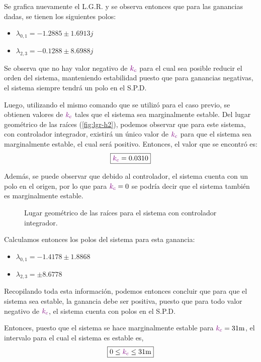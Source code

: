 Se grafica nuevamente el L.G.R. y se observa entonces que para las ganancias dadas,
se tienen los siguientes polos:
\begin{itemize}
    \item $\lambda_{0,1} = -1.2885 \pm 1.6913j$
    \item $\lambda_{2,3} = -0.1288 \pm 8.6988j$
\end{itemize}

Se observa que no hay valor negativo de $\mathbin{\color{violet}k_{c}}$ para el cual sea posible
reducir el orden del sistema, manteniendo estabilidad puesto que para ganancias
negativas, el sistema siempre tendrá un polo en el S.P.D.

Luego, utilizando el mismo comando que se utilizó para el caso previo, se obtienen
valores de $\mathbin{\color{violet}k_{c}}$ tales que el sistema sea marginalmente estable. Del lugar
geométrico de las raíces (\autoref{fig:lgr-h2}), podemos observar que para este sistema,
con controlador integrador, existirá un único valor de $\mathbin{\color{violet}k_{c}}$ para que
el sistema sea marginalmente estable, el cual será positivo. Entonces, el valor
que se encontró es:
\begin{equation}
    \boxed{\mathbin{\color{violet}k_{c}} = 0.0310}
\end{equation}

Además, se puede observar que debido al controlador, el sistema cuenta con un
polo en el origen, por lo que para $\mathbin{\color{violet}k_{c}} = 0$ se podría decir que el
sistema también es marginalmente estable.

\begin{figure}[ht]
    \centering
    
    \caption{Lugar geométrico de las raíces para el sistema con controlador integrador.}
    \label{fig:lgr-h2}
\end{figure}

Calculamos entonces los polos del sistema para esta ganancia:
\begin{itemize}
    \item $\lambda_{0,1} = -1.4178 \pm 1.8868$
    \item $\lambda_{2,3} = \pm 8.6778$
\end{itemize}

Recopilando toda esta información, podemos entonces concluir que para que el
sistema sea estable, la ganancia debe ser positiva, puesto que para todo valor
negativo de $\mathbin{\color{violet}k_{c}}$, el sistema cuenta con polos en el S.P.D.

Entonces, puesto que el sistema se hace marginalmente estable para $\mora{k_{c}} = 31\unit{m}$,
el intervalo para el cual el sistema es estable es,
\begin{equation}
    \boxed{0 \leq \mora{k_{c}} \leq 31\unit{m}}
\end{equation}

